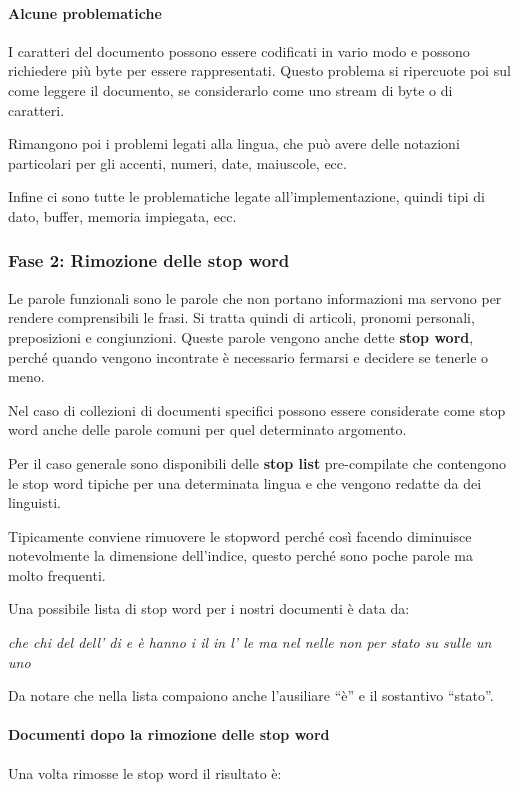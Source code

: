 \paragraph{Alcune problematiche}

I caratteri del documento possono essere codificati in vario modo e possono richiedere più byte per essere rappresentati. 
Questo problema si ripercuote poi sul come leggere il documento, se considerarlo come uno stream di byte o di caratteri.

Rimangono poi i problemi legati alla lingua, che può avere delle notazioni particolari per gli accenti, numeri, date, maiuscole, ecc.

Infine ci sono tutte le problematiche legate all'implementazione, quindi tipi di dato, buffer, memoria impiegata, ecc.

\subsubsection{Fase 2: Rimozione delle stop word} 

Le parole funzionali sono le parole che non portano informazioni ma servono per rendere comprensibili le frasi. Si tratta quindi di articoli, pronomi personali, preposizioni e congiunzioni.
Queste parole vengono anche dette \textbf{stop word}, perché quando vengono incontrate è necessario fermarsi e decidere se tenerle o meno.

Nel caso di collezioni di documenti specifici possono essere considerate come stop word anche delle parole comuni per quel determinato argomento.

Per il caso generale sono disponibili delle \textbf{stop list} pre-compilate che contengono le stop word tipiche per una determinata lingua e che vengono redatte da dei linguisti.

Tipicamente conviene rimuovere le stopword perché così facendo diminuisce notevolmente la dimensione dell'indice, questo perché sono poche parole ma molto frequenti.

Una possibile lista di stop word per i nostri documenti è data da:

\begin{center}
	\textit{che chi del dell’ di e è hanno i il in l’ le ma nel
		nelle non per stato su sulle un uno }
\end{center}

Da notare che nella lista compaiono anche l'ausiliare ``è'' e il sostantivo ``stato''.

\paragraph{Documenti dopo la rimozione delle stop word} Una volta rimosse le stop word il risultato è:

